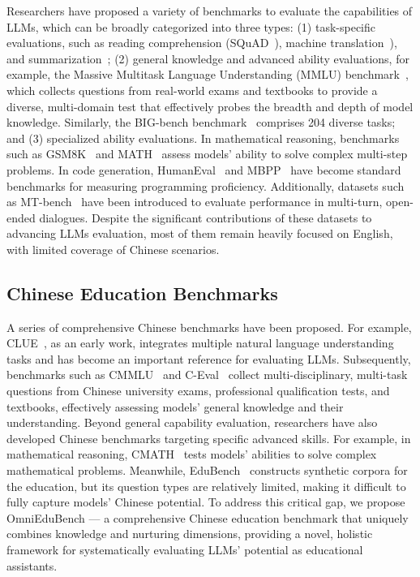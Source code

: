 Researchers have proposed a variety of benchmarks to evaluate the capabilities of LLMs, which can be broadly categorized into three types: (1) task-specific evaluations, such as reading comprehension (SQuAD~\citep{rajpurkar2016squad}), machine translation~\citep{bojar-etal-2014-findings}), and summarization~\citep{hermann2015teaching}; (2) general knowledge and advanced ability evaluations, for example, the Massive Multitask Language Understanding (MMLU) benchmark~\citep{hendrycks2021measuring}, which collects questions from real-world exams and textbooks to provide a diverse, multi-domain test that effectively probes the breadth and depth of model knowledge. Similarly, the BIG-bench benchmark~\citep{srivastava2022beyond} comprises 204 diverse tasks; and (3) specialized ability evaluations. In mathematical reasoning, benchmarks such as GSM8K~\citep{cobbe2021gsm8k} and MATH~\citep{hendrycks2021measuring} assess models’ ability to solve complex multi-step problems. In code generation, HumanEval~\citep{chen2021evaluating} and MBPP~\citep{austin2021program} have become standard benchmarks for measuring programming proficiency. Additionally, datasets such as MT-bench~\citep{zheng2023judging} have been introduced to evaluate performance in multi-turn, open-ended dialogues. Despite the significant contributions of these datasets to advancing LLMs evaluation, most of them remain heavily focused on English, with limited coverage of Chinese scenarios.

\subsection{Chinese Education Benchmarks}

A series of comprehensive Chinese benchmarks have been proposed. For example, CLUE~\citep{xu2020clue}, as an early work, integrates multiple natural language understanding tasks and has become an important reference for evaluating LLMs. Subsequently, benchmarks such as CMMLU~\citep{li2023cmmlu} and C-Eval~\citep{huang2023ceval} collect multi-disciplinary, multi-task questions from Chinese university exams, professional qualification tests, and textbooks, effectively assessing models’ general knowledge and their understanding. Beyond general capability evaluation, researchers have also developed Chinese benchmarks targeting specific advanced skills. For example, in mathematical reasoning, CMATH~\citep{wei2023cmath} tests models’ abilities to solve complex mathematical problems. Meanwhile, EduBench~\citep{xu2025edubench} constructs synthetic corpora for the education, but its question types are relatively limited, making it difficult to fully capture models’ Chinese potential. To address this critical gap, we propose OmniEduBench — a comprehensive Chinese education benchmark that uniquely combines knowledge and nurturing dimensions, providing a novel, holistic framework for systematically evaluating LLMs’ potential as educational assistants.